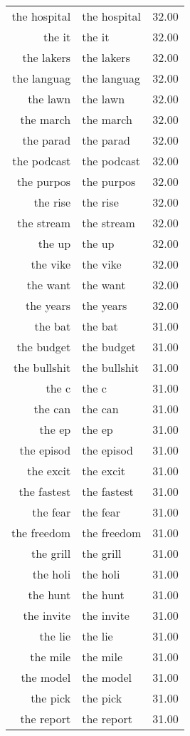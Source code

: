 \begin{table}[ht]
\begin{tabular}{rlr}
  the hospital & the hospital & 32.00 \\ 
  the it & the it & 32.00 \\ 
  the lakers & the lakers & 32.00 \\ 
  the languag & the languag & 32.00 \\ 
  the lawn & the lawn & 32.00 \\ 
  the march & the march & 32.00 \\ 
  the parad & the parad & 32.00 \\ 
  the podcast & the podcast & 32.00 \\ 
  the purpos & the purpos & 32.00 \\ 
  the rise & the rise & 32.00 \\ 
  the stream & the stream & 32.00 \\ 
  the up & the up & 32.00 \\ 
  the vike & the vike & 32.00 \\ 
  the want & the want & 32.00 \\ 
  the years & the years & 32.00 \\ 
  the bat & the bat & 31.00 \\ 
  the budget & the budget & 31.00 \\ 
  the bullshit & the bullshit & 31.00 \\ 
  the c & the c & 31.00 \\ 
  the can & the can & 31.00 \\ 
  the ep & the ep & 31.00 \\ 
  the episod & the episod & 31.00 \\ 
  the excit & the excit & 31.00 \\ 
  the fastest & the fastest & 31.00 \\ 
  the fear & the fear & 31.00 \\ 
  the freedom & the freedom & 31.00 \\ 
  the grill & the grill & 31.00 \\ 
  the holi & the holi & 31.00 \\ 
  the hunt & the hunt & 31.00 \\ 
  the invite & the invite & 31.00 \\ 
  the lie & the lie & 31.00 \\ 
  the mile & the mile & 31.00 \\ 
  the model & the model & 31.00 \\ 
  the pick & the pick & 31.00 \\ 
  the report & the report & 31.00 \\ 

\end{tabular}
\end{table}
